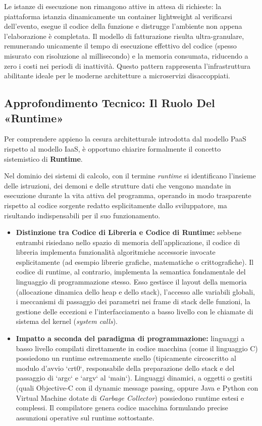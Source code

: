\documentclass[11pt, a4paper]{article}
\begin{document}
Le istanze di esecuzione non rimangono attive in attesa di richieste: la piattaforma istanzia dinamicamente un container lightweight al verificarsi dell'evento, esegue il codice della funzione e distrugge l'ambiente non appena l'elaborazione è completata. Il modello di fatturazione risulta ultra-granulare, remunerando unicamente il tempo di esecuzione effettivo del codice (spesso misurato con risoluzione al millisecondo) e la memoria consumata, riducendo a zero i costi nei periodi di inattività. Questo pattern rappresenta l'infrastruttura abilitante ideale per le moderne architetture a microservizi disaccoppiati.

\subsection{Approfondimento Tecnico: Il Ruolo Del «Runtime»}

Per comprendere appieno la cesura architetturale introdotta dal modello PaaS rispetto al modello IaaS, è opportuno chiarire formalmente il concetto sistemistico di \textbf{Runtime}.

Nel dominio dei sistemi di calcolo, con il termine \emph{runtime} si identificano l'insieme delle istruzioni, dei demoni e delle strutture dati che vengono mandate in esecuzione durante la vita attiva del programma, operando in modo trasparente rispetto al codice sorgente redatto esplicitamente dallo sviluppatore, ma risultando indispensabili per il suo funzionamento.

\begin{itemize}
    \item \textbf{Distinzione tra Codice di Libreria e Codice di Runtime:} sebbene entrambi risiedano nello spazio di memoria dell'applicazione, il codice di libreria implementa funzionalità algoritmiche accessorie invocate esplicitamente (ad esempio librerie grafiche, matematiche o crittografiche). Il codice di runtime, al contrario, implementa la semantica fondamentale del linguaggio di programmazione stesso. Esso gestisce il layout della memoria (allocazione dinamica dello heap e dello stack), l'accesso alle variabili globali, i meccanismi di passaggio dei parametri nei frame di stack delle funzioni, la gestione delle eccezioni e l'interfacciamento a basso livello con le chiamate di sistema del kernel (\emph{system calls}).
    \item \textbf{Impatto a seconda del paradigma di programmazione:} linguaggi a basso livello compilati direttamente in codice macchina (come il linguaggio C) possiedono un runtime estremamente snello (tipicamente circoscritto al modulo d'avvio `crt0`, responsabile della preparazione dello stack e del passaggio di `argc` e `argv` al `main`). Linguaggi dinamici, a oggetti o gestiti (quali Objective-C con il dynamic message passing, oppure Java e Python con Virtual Machine dotate di \emph{Garbage Collector}) possiedono runtime estesi e complessi. Il compilatore genera codice macchina formulando precise assunzioni operative sul runtime sottostante.
\end{itemize}
\end{document}
